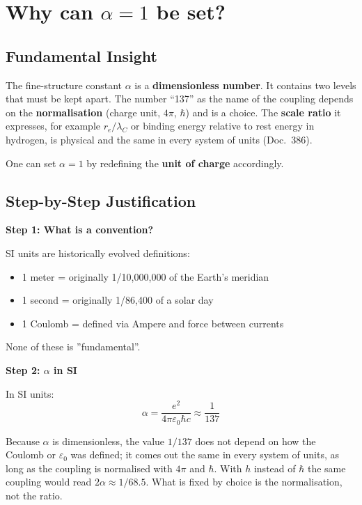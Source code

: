 	\section{Why can $\alpha = 1$ be set?}
	
	\subsection{Fundamental Insight}
	
	\begin{tcolorbox}[colback=blue!5!white,colframe=blue!75!black,title=Core Statement]
		The fine-structure constant $\alpha$ is a \textbf{dimensionless number}. It contains two levels that must be kept apart. The number ``137'' as the name of the coupling depends on the \textbf{normalisation} (charge unit, $4\pi$, $\hbar$) and is a choice. The \textbf{scale ratio} it expresses, for example $r_e/\lambda_C$ or binding energy relative to rest energy in hydrogen, is physical and the same in every system of units (Doc.~386).
		
		One can set $\alpha = 1$ by redefining the \textbf{unit of charge} accordingly.
	\end{tcolorbox}
	
	\subsection{Step-by-Step Justification}
	
	\textbf{Step 1: What is a convention?}
	
	SI units are historically evolved definitions:
	\begin{itemize}
		\item 1 meter = originally 1/10,000,000 of the Earth's meridian
		\item 1 second = originally 1/86,400 of a solar day
		\item 1 Coulomb = defined via Ampere and force between currents
	\end{itemize}
	
	None of these is ''fundamental''.
	
	\textbf{Step 2: $\alpha$ in SI}
	
	In SI units:
	\begin{equation}
		\alpha = \frac{e^2}{4\pi\varepsilon_0\hbar c} \approx \frac{1}{137}
	\end{equation}
	
	Because $\alpha$ is dimensionless, the value $1/137$ does not depend on how the Coulomb or $\varepsilon_0$ was defined; it comes out the same in every system of units, as long as the coupling is normalised with $4\pi$ and $\hbar$. With $h$ instead of $\hbar$ the same coupling would read $2\alpha \approx 1/68.5$. What is fixed by choice is the normalisation, not the ratio.
	
